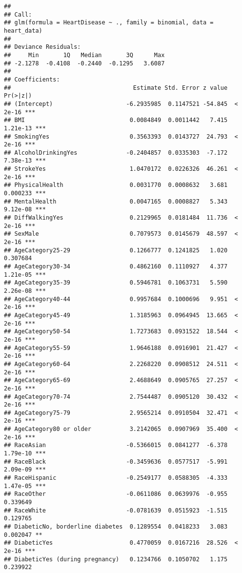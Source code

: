 \documentclass[
]{article}
\begin{document}
\begin{verbatim}
## 
## Call:
## glm(formula = HeartDisease ~ ., family = binomial, data = heart_data)
## 
## Deviance Residuals: 
##     Min       1Q   Median       3Q      Max  
## -2.1278  -0.4108  -0.2440  -0.1295   3.6087  
## 
## Coefficients:
##                                   Estimate Std. Error z value Pr(>|z|)    
## (Intercept)                     -6.2935985  0.1147521 -54.845  < 2e-16 ***
## BMI                              0.0084849  0.0011442   7.415 1.21e-13 ***
## SmokingYes                       0.3563393  0.0143727  24.793  < 2e-16 ***
## AlcoholDrinkingYes              -0.2404857  0.0335303  -7.172 7.38e-13 ***
## StrokeYes                        1.0470172  0.0226326  46.261  < 2e-16 ***
## PhysicalHealth                   0.0031770  0.0008632   3.681 0.000233 ***
## MentalHealth                     0.0047165  0.0008827   5.343 9.12e-08 ***
## DiffWalkingYes                   0.2129965  0.0181484  11.736  < 2e-16 ***
## SexMale                          0.7079573  0.0145679  48.597  < 2e-16 ***
## AgeCategory25-29                 0.1266777  0.1241825   1.020 0.307684    
## AgeCategory30-34                 0.4862160  0.1110927   4.377 1.21e-05 ***
## AgeCategory35-39                 0.5946781  0.1063731   5.590 2.26e-08 ***
## AgeCategory40-44                 0.9957684  0.1000696   9.951  < 2e-16 ***
## AgeCategory45-49                 1.3185963  0.0964945  13.665  < 2e-16 ***
## AgeCategory50-54                 1.7273683  0.0931522  18.544  < 2e-16 ***
## AgeCategory55-59                 1.9646188  0.0916901  21.427  < 2e-16 ***
## AgeCategory60-64                 2.2268220  0.0908512  24.511  < 2e-16 ***
## AgeCategory65-69                 2.4688649  0.0905765  27.257  < 2e-16 ***
## AgeCategory70-74                 2.7544487  0.0905120  30.432  < 2e-16 ***
## AgeCategory75-79                 2.9565214  0.0910504  32.471  < 2e-16 ***
## AgeCategory80 or older           3.2142065  0.0907969  35.400  < 2e-16 ***
## RaceAsian                       -0.5366015  0.0841277  -6.378 1.79e-10 ***
## RaceBlack                       -0.3459636  0.0577517  -5.991 2.09e-09 ***
## RaceHispanic                    -0.2549177  0.0588305  -4.333 1.47e-05 ***
## RaceOther                       -0.0611086  0.0639976  -0.955 0.339649    
## RaceWhite                       -0.0781639  0.0515923  -1.515 0.129765    
## DiabeticNo, borderline diabetes  0.1289554  0.0418233   3.083 0.002047 ** 
## DiabeticYes                      0.4770059  0.0167216  28.526  < 2e-16 ***
## DiabeticYes (during pregnancy)   0.1234766  0.1050702   1.175 0.239922    

\end{verbatim}
\end{document}
